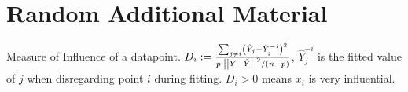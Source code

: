 \section{Random Additional Material}

 Measure of Influence of a datapoint. $D_i := \frac{\sum_{j \neq i}\left( \hat{Y}_j - \hat{Y}_j^{-i} \right)^2}{p \cdot \left\vert\left\vert Y - \hat{Y} \right\vert\right\vert^2 / (n-p)}$, $\hat{Y}_j^{-i}$ is the fitted value of $j$ when disregarding point $i$ during fitting. $D_i>0$ means $x_i$ is very influential.